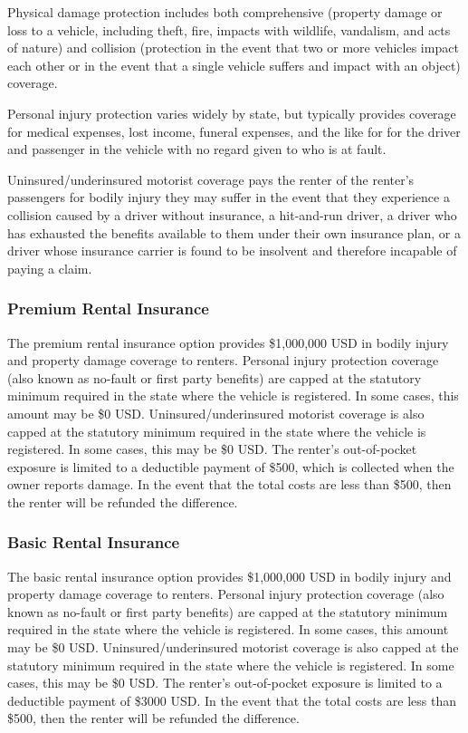 \documentclass[preprint,12pt]{elsarticle}
\begin{document}
Physical damage protection includes both comprehensive (property damage or loss to a vehicle, including theft, fire, impacts with wildlife,  vandalism, and acts of nature) and collision (protection in the event that two or more vehicles impact each other or in the event that a single vehicle suffers and impact with an object) coverage.

Personal injury protection varies widely by state, but typically provides coverage for medical expenses, lost income, funeral expenses, and the like for for the driver and passenger in the vehicle with no regard given to who is at fault.

Uninsured/underinsured motorist coverage pays the renter of the renter's passengers for bodily injury they may suffer in the event that they experience a collision caused by a driver without insurance, a hit-and-run driver, a driver who has exhausted the benefits available to them under their own insurance plan, or a driver whose insurance carrier is found to be insolvent and therefore incapable of paying a claim.

\subsubsection{Premium Rental Insurance}
The premium rental insurance option provides \$1,000,000 USD in bodily injury and property damage coverage to renters. Personal injury protection coverage (also known as no-fault or first party benefits) are capped at the statutory minimum required in the state where the vehicle is registered. In some cases, this amount may be \$0 USD. Uninsured/underinsured motorist coverage is also capped at the statutory minimum required in the state where the vehicle is registered. In some cases, this may be \$0 USD. The renter's out-of-pocket exposure is limited to a deductible payment of \$500, which is collected when the owner reports damage. In the event that the total costs are less than \$500, then the renter will be refunded the difference.

\subsubsection{Basic Rental Insurance}
The basic rental insurance option provides \$1,000,000 USD in bodily injury and property damage coverage to renters. Personal injury protection coverage (also known as no-fault or first party benefits) are capped at the statutory minimum required in the state where the vehicle is registered. In some cases, this amount may be \$0 USD. Uninsured/underinsured motorist coverage is also capped at the statutory minimum required in the state where the vehicle is registered. In some cases, this may be \$0 USD. The renter's out-of-pocket exposure is limited to a deductible payment of \$3000 USD. In the event that the total costs are less than \$500, then the renter will be refunded the difference.
\end{document}
